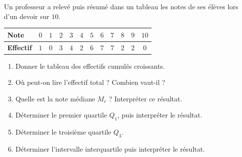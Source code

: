 \begin{exo}
	Un professeur a relevé puis résumé dans un tableau les notes de ses élèves lors d'un devoir sur $10$.

	\begin{center}
		\renewcommand{\arraystretch}{1.4}
		\begin{tabular}{|l|*{11}{c|}}
			\hline
			\textbf{Note}     & $0$ & $1$ & $2$ & $3$ & $4$ & $5$ & $6$ & $7$ & $8$ & $9$ & $10$ \\ \hline
			\textbf{Effectif} & $1$ & $0$ & $3$ & $4$ & $2$ & $6$ & $7$ & $7$ & $2$ & $2$ & $0$  \\ \hline
		\end{tabular}
	\end{center}

	\begin{enumerate}
		\item Donner le tableau des effectifs cumulés croissants.
		\item Où peut-on lire l'effectif total ? Combien vaut-il ?
		\item Quelle est la note médiane $M_e$ ? Interpréter ce résultat.
		\item Déterminer le premier quartile $Q_1$, puis interpréter le résultat.
		\item Déterminer le troisième quartile $Q_3$.
		\item Déterminer l'intervalle interquartile puis interpréter le résultat.
	\end{enumerate}
\end{exo}
